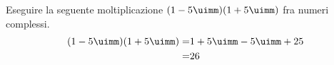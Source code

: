 	Eseguire la seguente moltiplicazione $(1-5\uimm)(1+5\uimm)$ fra numeri complessi.
	\begin{align*}
	(1-5\uimm)(1+5\uimm)=&1+5\uimm-5\uimm+25\\
	=&26
	\end{align*}
